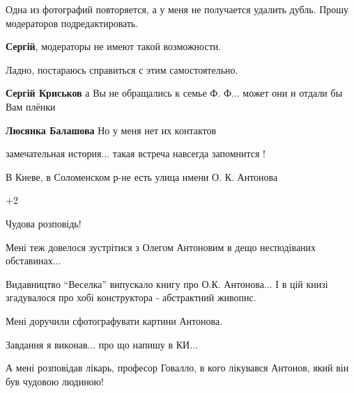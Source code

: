  
 
 
 
 
\zzSecCmt

\begin{itemize} %

Одна из фотографий повторяется, а у меня не получается удалить дубль. Прошу
модераторов подредактировать.

\begin{itemize} %
\textbf{Сергій}, модераторы не имеют такой возможности.


Ладно, постараюсь справиться с этим самостоятельно.

\textbf{Сергій Криськов} а Вы не обращались к семье Ф. Ф... может они и отдали бы Вам плёнки

\textbf{Люсянка Балашова} Но у меня нет их контактов
\end{itemize} %

замечательная история... такая встреча навсегда запомнится !

В Киеве, в Соломенском р-не есть улица имени О. К. Антонова


+2

Чудова розповідь!

Мені теж довелося зустрітися з Олегом Антоновим в дещо несподіваних
обставинах...

Видавництво \enquote{Веселка} випускало книгу про О.К. Антонова... І в цій книзі
згадувалося про хобі конструктора - абстрактний живопис.

Мені доручили сфотографувати картини Антонова.

Завдання я виконав... про що напишу в КИ...


А мені розповідав лікарь, професор Говалло, в кого лікувався Антонов, який він
був чудовою людиною!



\end{itemize}
